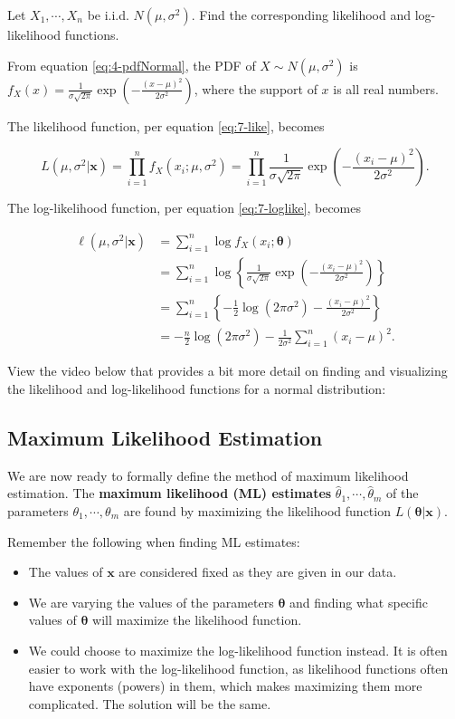 \documentclass[
]{book}
\providecommand{\tightlist}{%
  \setlength{\itemsep}{0pt}\setlength{\parskip}{0pt}}
\begin{document}
Let \(X_1, \cdots, X_n\) be i.i.d. \(N(\mu, \sigma^2)\). Find the corresponding likelihood and log-likelihood functions.

From equation \eqref{eq:4-pdfNormal}, the PDF of \(X \sim N(\mu, \sigma^2)\) is \(f_X(x) =  \frac{1}{\sigma \sqrt{2 \pi}} \exp \left(-\frac{(x - \mu)^2}{2 \sigma^2} \right)\), where the support of \(x\) is all real numbers.

The likelihood function, per equation \eqref{eq:7-like}, becomes

\[
L(\mu, \sigma^2 | \boldsymbol{x} ) = \prod_{i=1}^n f_X(x_i; \mu, \sigma^2) = \prod_{i=1}^n \frac{1}{\sigma \sqrt{2 \pi}} \exp \left(-\frac{(x_i - \mu)^2}{2 \sigma^2} \right).
\]

The log-likelihood function, per equation \eqref{eq:7-loglike}, becomes

\[
\begin{split}
\ell (\mu, \sigma^2 | \boldsymbol{x}) &= \sum_{i=1}^n \log f_X(x_i; \boldsymbol{\theta}) \\
                          &= \sum_{i=1}^n \log \left\{ \frac{1}{\sigma \sqrt{2 \pi}} \exp \left(-\frac{(x_i - \mu)^2}{2 \sigma^2} \right) \right\} \\
                          &= \sum_{i=1}^n \left\{-\frac{1}{2} \log (2 \pi \sigma^2) -\frac{(x_i - \mu)^2}{2 \sigma^2} \right\} \\
                          &= -\frac{n}{2} \log (2 \pi \sigma^2) - \frac{1}{2 \sigma^2} \sum_{i=1}^n (x_i - \mu)^2.
\end{split}
\]

View the video below that provides a bit more detail on finding and visualizing the likelihood and log-likelihood functions for a normal distribution:

\subsection{Maximum Likelihood Estimation}\label{maximum-likelihood-estimation}

We are now ready to formally define the method of maximum likelihood estimation. The \textbf{maximum likelihood (ML) estimates} \(\hat{\theta}_1, \cdots, \hat{\theta}_m\) of the parameters \(\theta_1, \cdots, \theta_m\) are found by maximizing the likelihood function \(L(\boldsymbol{\theta} | \boldsymbol{x} )\).

Remember the following when finding ML estimates:

\begin{itemize}
\tightlist
\item
  The values of \(\boldsymbol{x}\) are considered fixed as they are given in our data.
\item
  We are varying the values of the parameters \(\boldsymbol{\theta}\) and finding what specific values of \(\boldsymbol{\theta}\) will maximize the likelihood function.
\item
  We could choose to maximize the log-likelihood function instead. It is often easier to work with the log-likelihood function, as likelihood functions often have exponents (powers) in them, which makes maximizing them more complicated. The solution will be the same.
\end{itemize}
\end{document}

